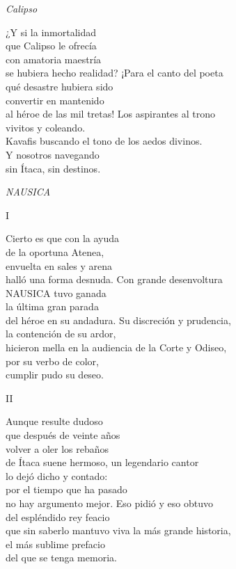 \emph{Calipso}

\begin{versocita}
¿Y si la inmortalidad\\
que Calipso le ofrecía\\
con amatoria maestría\\
se hubiera hecho realidad?
\stanzabreak
¡Para el canto del poeta\\
qué desastre hubiera sido\\
convertir en mantenido\\
al héroe de las mil tretas!
\stanzabreak
Los aspirantes al trono\\
vivitos y coleando.\\
Kavafis buscando el tono
\stanzabreak
de los aedos divinos.\\
Y nosotros navegando\\
sin Ítaca, sin destinos.
\end{versocita}

\emph{NAUSICA}

I

\begin{versocita}
Cierto es que con la ayuda\\
de la oportuna Atenea,\\
envuelta en sales y arena\\
halló una forma desnuda.
\stanzabreak
Con grande desenvoltura\\
NAUSICA tuvo ganada\\
la última gran parada\\
del héroe en su andadura.
\stanzabreak
Su discreción y prudencia,\\
la contención de su ardor,\\
hicieron mella en la audiencia
\stanzabreak
de la Corte y Odiseo,\\
por su verbo de color,\\
cumplir pudo su deseo.
\end{versocita}

II

\begin{versocita}
Aunque resulte dudoso\\
que después de veinte años\\
volver a oler los rebaños\\
de Ítaca suene hermoso,
\stanzabreak
un legendario cantor\\
lo dejó dicho y contado:\\
por el tiempo que ha pasado\\
no hay argumento mejor.
\stanzabreak
Eso pidió y eso obtuvo\\
del espléndido rey feacio\\
que sin saberlo mantuvo
\stanzabreak
viva la más grande historia,\\
el más sublime prefacio\\
del que se tenga memoria.
\end{versocita}

